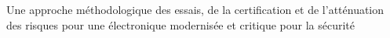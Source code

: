 Une approche méthodologique des essais, de la certification et de l’atténuation des risques pour une électronique modernisée et critique pour la sécurité